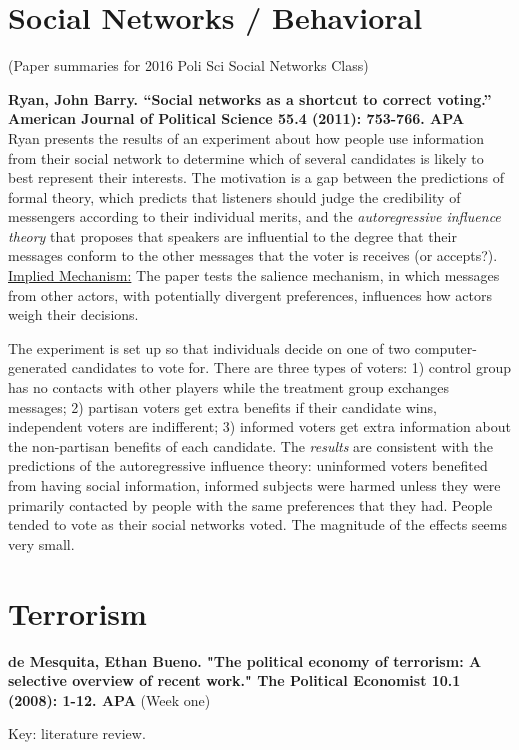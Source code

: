 \documentclass{article}[12pt]
\begin{document}
\section{Social Networks / Behavioral}
(Paper summaries for 2016 Poli Sci Social Networks Class)

\textbf{Ryan, John Barry. ``Social networks as a shortcut to correct voting.'' American Journal of Political Science 55.4 (2011): 753-766. APA}\\
Ryan presents the results of an experiment about how people use information from their social network to determine which of several candidates is likely to best represent their interests. The motivation is a gap between the predictions of formal theory, which predicts that listeners should judge the credibility of messengers according to their individual merits, and the \textit{autoregressive influence theory} that proposes that speakers are influential to the degree that their messages conform to the other messages that the voter is receives (or accepts?). \underline{Implied Mechanism:} The paper tests the salience mechanism, in which messages from other actors, with potentially divergent preferences, influences how actors weigh their decisions.

The experiment is set up so that individuals decide on one of two computer-generated candidates to vote for. There are three types of voters: 1) control group has no contacts with other players while the treatment group exchanges messages; 2) partisan voters get extra benefits if their candidate wins, independent voters are indifferent; 3) informed voters get extra information about the non-partisan benefits of each candidate. The \textit{results} are consistent with the predictions of the autoregressive influence theory: uninformed voters benefited from having social information, informed subjects were harmed unless they were primarily contacted by people with the same preferences that they had. People tended to vote as their social networks voted. The magnitude of the effects seems very small.


\section{Terrorism}

\textbf{de Mesquita, Ethan Bueno. "The political economy of terrorism: A selective overview of recent work." The Political Economist 10.1 (2008): 1-12.
APA} (Week one)

Key: literature review.
 
\end{document}
